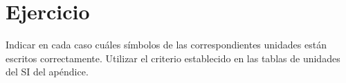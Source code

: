 \section{Ejercicio}\label{ej:Chap01Ejercicio08}
Indicar en cada caso cuáles símbolos de las correspondientes unidades están escritos correctamente. Utilizar el criterio establecido en las tablas de unidades del SI del apéndice.